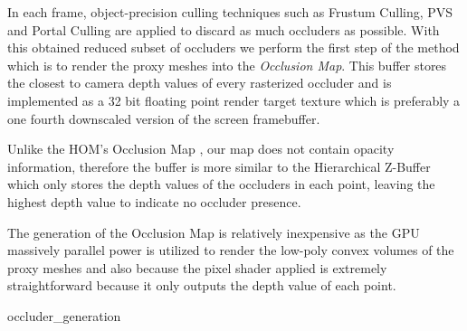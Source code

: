 \documentclass[10pt, conference]{IEEEtran}
\begin{document}
In each frame, object-precision culling techniques such as Frustum Culling, PVS and Portal Culling \cite{survey_visibility} are applied 
to discard as much occluders as possible. 
With this obtained reduced subset of occluders we perform the first step of the method which is to render the proxy meshes into the \emph{Occlusion Map}. 
This buffer stores the closest to camera depth values of every rasterized occluder and is implemented as a 32 bit floating point render target texture 
which is preferably a one fourth downscaled version of the screen framebuffer. \

Unlike the HOM's Occlusion Map \cite{hom}, our map does not contain opacity information, therefore the buffer is more similar 
to the Hierarchical Z-Buffer \cite{Hierarchical_zbuffer} which only stores the depth values of the occluders in 
each point, leaving the highest depth value to indicate no occluder presence.\

The generation of the Occlusion Map is relatively inexpensive as the GPU massively parallel power is utilized to render the low-poly convex volumes of 
the proxy meshes and also because the pixel shader applied is extremely straightforward because it only outputs the depth value of each point.

{occluder_generation}{
%
}


\end{document}
